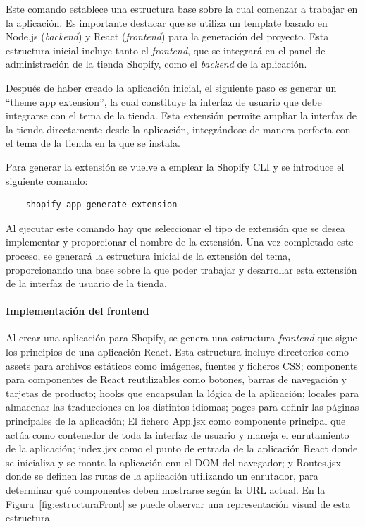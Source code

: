 \documentclass[12pt]{article}
\newcommand{\subsubsubsection}[1]{\paragraph{#1}}
\begin{document}
Este comando establece una estructura base sobre la cual comenzar a trabajar en la aplicación. Es importante destacar que se utiliza un template 
basado en Node.js (\textit{backend}) y React (\textit{frontend}) para la generación del proyecto. Esta estructura inicial incluye tanto el \textit{frontend}, que se 
integrará en el panel de administración de la tienda Shopify, como el \textit{backend} de la aplicación.

Después de haber creado la aplicación inicial, el siguiente paso es generar un ``theme app extension'',
la cual constituye la interfaz de usuario que debe integrarse con el tema de la tienda. Esta extensión 
permite ampliar la interfaz de la tienda directamente desde la aplicación, integrándose de manera perfecta 
con el tema de la tienda en la que se instala.

Para generar la extensión se vuelve a emplear la Shopify CLI y se introduce el siguiente comando:

\begin{lstlisting}
    shopify app generate extension
\end{lstlisting}

Al ejecutar este comando hay que seleccionar el tipo de extensión que se desea implementar y proporcionar el nombre de la extensión. Una vez completado este proceso,
se generará la estructura inicial de la extensión del tema, proporcionando una base sobre la que poder trabajar y desarrollar esta extensión 
de la interfaz de usuario de la tienda.

\clearpage
\subsubsubsection{Implementación del frontend}

Al crear una aplicación para Shopify, se genera una estructura \textit{frontend} que sigue los principios de una aplicación React. Esta estructura incluye directorios como assets para 
archivos estáticos como imágenes, fuentes y ficheros CSS; components para componentes de React reutilizables como botones, barras de navegación y tarjetas de producto; 
hooks que encapsulan la lógica de la aplicación; locales para almacenar las traducciones en los distintos idiomas; pages para definir las páginas principales de la aplicación; El fichero App.jsx como
componente principal que actúa como contenedor de toda la interfaz de usuario y maneja el enrutamiento de la aplicación; index.jsx como el punto de entrada de la aplicación React donde
se inicializa y se monta la aplicación enn el DOM del navegador; y Routes.jsx donde se definen las rutas de la aplicación utilizando un enrutador, para determinar qué componentes
deben mostrarse según la URL actual. En la Figura~\ref{fig:estructuraFront} se puede observar una representación visual de esta estructura.
\end{document}
